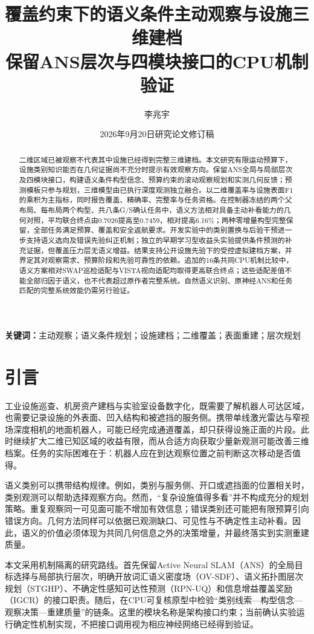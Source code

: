 \documentclass[11pt,a4paper]{article}
\title{\textbf{覆盖约束下的语义条件主动观察与设施三维建档}\\[5pt]
\large 保留ANS层次与四模块接口的CPU机制验证}
\author{李兆宇}
\date{2026年9月20日研究论文修订稿}
\begin{document}
\maketitle
\begin{abstract}
二维区域已被观察不代表其中设施已经得到完整三维建档。本文研究有限运动预算下，设施类别知识能否在几何证据尚不充分时提示有效观察方向。保留ANS全局与局部层次及四模块接口，构建语义条件构型信念、预算约束的滚动观察规划和实测几何反馈；预测模板只参与规划，三维模型由已执行深度观测独立融合。以二维覆盖率与设施表面F1的乘积为主指标，同时报告覆盖、精确率、完整率与任务资格。在控制器冻结的两个父布局、每布局两个构型、共八条G/S确认任务中，语义方法相对具备主动补看能力的几何对照，平均联合终点由0.7026提高至0.7459，相对提高6.16\%；两种零增量构型完整保留，全部任务满足预算、覆盖和安全返航要求。开发实验中的类别置换与后验干预进一步支持语义选向及错误先验纠正机制；独立的早期学习型收益头实验提供条件预测的补充证据，但覆盖压力层无语义增益。结果支持公开设施先验下的受控虚拟建档方案，并界定其对观察需求、预算阶段和先验可靠性的依赖。追加的16条共同CPU机制比较中，语义方案相对SWAP巡检适配与VISTA视向适配均取得更高联合终点；这些适配差值不能全部归因于语义，也不代表超过原作者完整系统。自然语义识别、原神经ANS和任务匹配的完整系统效能仍需另行验证。
\end{abstract}
\noindent\textbf{关键词：}主动观察；语义条件规划；设施建档；二维覆盖；表面重建；层次规划

\section{引言}
工业设施巡查、机房资产建档与实验室设备数字化，既需要了解机器人可达区域，也需要记录设施的外表面、凹入结构和被遮挡的服务侧。携带单线激光雷达与窄视场深度相机的地面机器人，可能已经完成通道覆盖，却只获得设施正面的片段。此时继续扩大二维已知区域的收益有限，而从合适方向获取少量新观测可能改善三维档案。任务的实际困难在于：机器人应在到达观察位置之前判断这次移动是否值得。

语义类别可以携带结构规律。例如，类别与服务侧、开口或遮挡面的位置相关时，类别观测可以帮助选择观察方向。然而，“复杂设施值得多看”并不构成充分的规划策略。重复观察同一可见面可能不增加有效信息；错误类别还可能把有限预算引向错误方向。几何方法同样可以依据已观测缺口、可见性与不确定性主动补看。因此，语义的价值必须体现为共同几何信息之外的决策增量，并最终落实到实测重建质量。

本文采用机制隔离的研究路线。首先保留Active Neural SLAM（ANS）的全局目标选择与局部执行层次\cite{chaplot2020}，明确开放词汇语义密度场（OV-SDF）、语义拓扑图层次规划（STGHP）、不确定性感知可达性预测（RPN-UQ）和信息增益覆盖奖励（IGCR）的接口职责。随后，在CPU可复核原型中检验“类别线索—构型信念—观察决策—重建质量”的链条。这里的模块名称是架构接口约束；当前确认实验运行确定性机制实现，不把接口调用视为相应神经网络已经得到验证。
\end{document}
